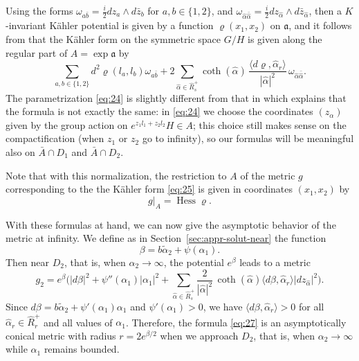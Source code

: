 \documentclass[10pt]{amsart}
\theoremstyle{plain}
\theoremstyle{definition}
\DeclareMathOperator{\Hess}{Hess}
\newcommand{\fa}{\mathfrak{a}}
\newcommand{\ta}{\tilde \alpha}
\newcommand{\ha}{\hat{\alpha}}
\newcommand{\Roots}{\hat{R}}
\begin{document}
Using the forms $\omega_{a\bar b}=\frac i2 dz_a\wedge d\bar z_b$ for $a,b\in \{1,2\}$, and $\omega_{\ha\bar \ha}=\frac i2 dz_{\ha}\wedge d\bar z_{\ha}$, then a $K$-invariant Kähler potential is given by a function $\varrho(x_1,x_2)$ on $\fa$, and it follows from \cite[Cor.\,2.11]{DelHoro} that the Kähler form on the symmetric space $G/H$ is given along the regular part of $A=\exp\fa$ by
\begin{equation}
\sum_{a,b\in\{1,2\}} d^2\varrho(l_a,l_b) \omega_{a\bar b}
+ 2 \sum_{\ha\in \Roots_s^+} \coth(\ha)\, \frac{\langle d\varrho, \ha_r\rangle}{|\ha|^2}\, \omega_{\ha\bar\ha}.\label{eq:25}
\end{equation}
The parametrization \eqref{eq:24} is slightly different from that in \cite{DelHoro} which explains that the formula is not exactly the same: in \eqref{eq:24} we choose the coordinates $(z_\alpha)$ given by the group action on $e^{z_1l_1+z_2l_2}H\in A$; this choice still makes sense on the compactification (when $z_1$ or $z_2$ go to infinity), so our formulas will be meaningful also on $\bar{A}\cap D_1$ and $\bar{A}\cap D_2$.

Note that with this normalization, the restriction to $A$ of the metric $g$ corresponding to the the Kähler form \eqref{eq:25} is given in coordinates $(x_1,x_2)$ by
\begin{equation}
g|_A = \Hess \varrho.
\end{equation}

With these formulas at hand, we can now give the asymptotic behavior of the metric at infinity. We define as in
Section~\ref{sec:appr-solut-near} the function
\[ \beta = b\ta_2+\psi(\alpha_1). \]
Then near $D_2$, that is, when $\alpha_2\to\infty$, the potential $e^\beta$ leads to a metric
\begin{equation}
\label{eq:27}
g_2 = e^\beta \biggl( |d\beta|^2 + \psi''(\alpha_1) |\alpha_1|^2 + \sum_{\ha\in \Roots_s^+} \frac2{|\ha|^2}\, \coth(\ha) \langle d\beta,\ha_r\rangle |dz_{\ha}|^2 \biggr).
\end{equation}
Since $d\beta=b\ta_2+\psi'(\alpha_1)\alpha_1$ and $\psi'(\alpha_1)>0$, we have $\langle d\beta,\ha_r\rangle>0$ for all $\ha_r\in \Roots_r^+$ and all values of $\alpha_1$. Therefore, the formula \eqref{eq:27} is an asymptotically conical metric with radius $r=2e^{\beta/2}$ when we approach $D_2$, that is, when $\alpha_2\to\infty$ while $\alpha_1$ remains bounded.
\end{document}
